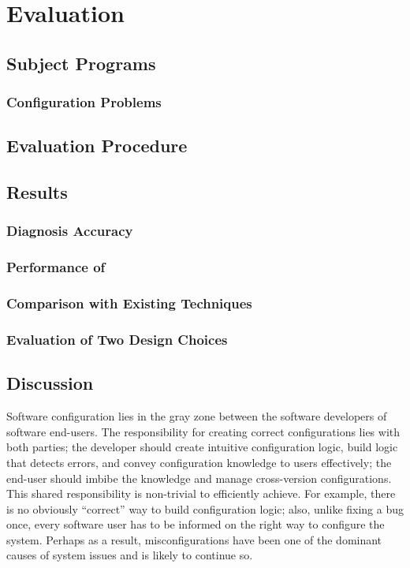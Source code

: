 
\section{Evaluation}
\label{sec:evaluation}

\subsection{Subject Programs}




\subsubsection{Configuration Problems}

\subsection{Evaluation Procedure}

\subsection{Results}

\subsubsection{Diagnosis Accuracy}

\subsubsection{Performance of \ourtool}

\subsubsection{Comparison with Existing Techniques}

\subsubsection{Evaluation of Two Design Choices}

\subsection{Discussion}

Software configuration lies in the gray zone between
the software developers of software end-users.
The responsibility for creating correct configurations
lies with both parties; the developer should create
intuitive configuration logic, build logic that detects
errors, and convey configuration knowledge to users
effectively;  the end-user should imbibe the
knowledge and manage cross-version configurations.
This shared responsibility is non-trivial to efficiently
achieve. For example, there is no obviously ``correct'' way to
build configuration logic; also, unlike fixing a bug once,
every software user has to be informed on the right way to
configure the system. Perhaps as a result, misconfigurations
have been one of the dominant causes of system issues and
is likely to continue so.

